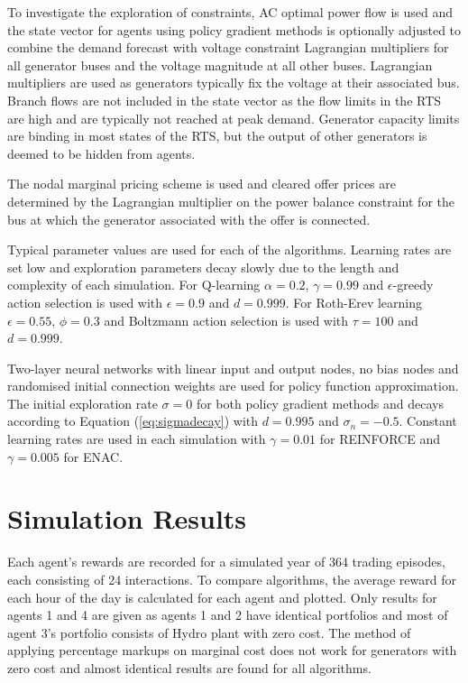 To investigate the exploration of constraints, AC optimal power flow is used and
the state vector for agents using policy gradient methods is optionally adjusted
to combine the demand forecast with voltage constraint Lagrangian multipliers
for all generator buses and the voltage magnitude at all other buses.  Lagrangian
multipliers are used as generators typically fix the voltage at their associated
bus.  Branch flows are not included in the state vector as the flow limits in
the RTS are high and are typically not reached at peak demand.  Generator
capacity limits are binding in most states of the RTS, but the output of other generators is
deemed to be hidden from agents.

The nodal marginal pricing scheme is used and cleared offer prices are
determined by the Lagrangian multiplier on the power balance constraint for the
bus at which the generator associated with the offer is connected.

Typical parameter values are used for each of the algorithms.  Learning rates
are set low and exploration parameters decay slowly due to the length
and complexity of each simulation.  For Q-learning $\alpha=0.2$, $\gamma=0.99$
and $\epsilon$-greedy action selection is used with $\epsilon=0.9$ and
$d=0.999$. For Roth-Erev learning $\epsilon=0.55$, $\phi=0.3$ and Boltzmann
action selection is used with $\tau=100$ and $d=0.999$.

Two-layer neural networks with linear input and output nodes, no bias nodes and
randomised initial connection weights are used for policy function
approximation.  The initial exploration rate $\sigma=0$ for both policy
gradient methods and decays according to Equation (\ref{eq:sigmadecay}) with
$d=0.995$ and $\sigma_n=-0.5$.  Constant learning rates are used in each
simulation with $\gamma=0.01$ for REINFORCE and $\gamma=0.005$ for ENAC.

\section{Simulation Results}
Each agent's rewards are recorded for a simulated year of 364 trading episodes,
each consisting of 24 interactions.  To compare algorithms, the average reward
for each hour of the day is calculated for each agent and plotted.  Only results
for agents 1 and 4 are given as agents 1 and 2 have identical portfolios and
most of agent 3's portfolio consists of Hydro plant with zero cost.  The method
of applying percentage markups on marginal cost does not work for generators
with zero cost and almost identical results are found for all algorithms.

